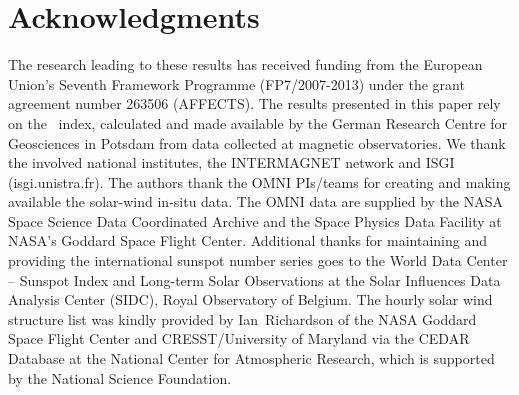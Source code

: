 \section{Acknowledgments}
The research leading to these results has received funding from the European Union's Seventh Framework Programme (FP7/2007-2013) under the grant agreement number 263506 (AFFECTS). The results presented in this paper rely on the \Kp{}~index, calculated and made available by the German Research Centre for Geosciences in Potsdam from data collected at magnetic observatories. We thank the involved national institutes, the INTERMAGNET network and ISGI (isgi.unistra.fr). The authors thank the OMNI PIs/teams for creating and making available the solar-wind in-situ data. The OMNI data are supplied by the NASA Space Science Data Coordinated Archive and the Space Physics Data Facility at NASA's Goddard Space Flight Center. Additional thanks for maintaining and providing the international sunspot number series goes to the World Data Center -- Sunspot Index and Long-term Solar Observations at the Solar Influences Data Analysis Center (SIDC), Royal Observatory of Belgium. The hourly solar wind structure list was kindly provided by Ian~Richardson of the NASA Goddard Space Flight Center and CRESST/University of Maryland via the CEDAR Database at the National Center for Atmospheric Research, which is supported by the National Science Foundation.




